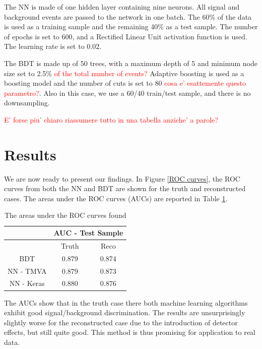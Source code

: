 \documentclass[10pt,a4paper]{book}
\newcommand\todo[1]{\textcolor{red}{#1}}
\begin{document}
The NN is made of one hidden layer containing nine neurons. All signal and background events are passed to the network in one batch. The 60\% of the data is used as a training sample and the remaining 40\% as a test sample. The number of epochs is set to 600, and a Rectified Linear Unit activation function is used. The learning rate is set to 0.02. 

The BDT is made up of 50 trees, with a maximum depth of 5 and minimum node size set to 2.5\% \todo{of the total number of events?} Adaptive boosting is used as a boosting model and the number of cuts is set to 80 \todo{cosa e' esattemente questo parametro?}. Also in this case, we use a 60/40 train/test sample, and there is no downsampling.

\todo{E' forse piu' chiaro riassumere tutto in una tabella anziche' a parole?}

\section{Results}

We are now ready to present our findings. In Figure \ref{ROC curves}, the ROC curves from both the NN and BDT are shown for the truth and reconstructed cases. The areas under the ROC curves (AUCs) are reported in Table \ref{AUC table}.

\begin{table}[!htb]
\centering
\begin{tabular}{|c|c|c|}
\hline 
\* & \multicolumn{2}{c|}{AUC - Test Sample} \\ 
\hline 
\* & Truth & Reco \\ 
\hline 
BDT & 0.879 & 0.874 \\ 
\hline 
NN - TMVA & 0.879 & 0.873 \\ 
\hline 
NN - Keras & 0.880 & 0.876 \\ 
\hline 
\end{tabular} 
\caption{The areas under the ROC curves found}
\label{AUC table}
\end{table} 

The AUCs show that in the truth case there both machine learning algorithms exhibit good signal/background discrimination. The results are unsurprisingly slightly worse for the reconstructed case due to the introduction of detector effects, but still quite good. This method is thus promising for application to real data.
\end{document}
